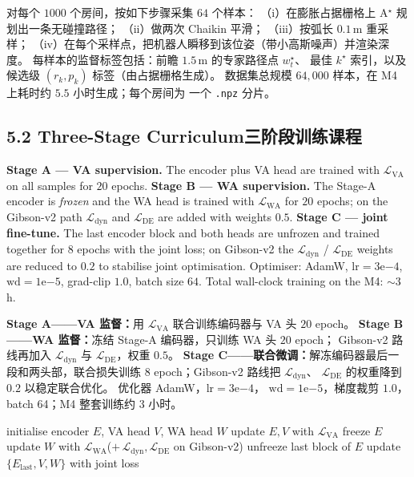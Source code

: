 \documentclass[11pt,a4paper]{article}
\newcommand{\en}[1]{\par\noindent #1\par\vspace{0.15em}}
\newcommand{\zh}[1]{\par\noindent\color{zhcol}\hspace{0.5em}#1\par\color{black}\vspace{0.6em}}
\newcommand{\bisubsec}[2]{\subsection[#1]{#1\quad\normalfont\small\color{zhcol}\textsf{#2}}}
\begin{document}
\zh{\textsf{对每个 $1000$ 个房间，按如下步骤采集 $64$ 个样本：
（i）在膨胀占据栅格上 A$^\star$ 规划出一条无碰撞路径；
（ii）做两次 Chaikin 平滑；
（iii）按弧长 $0.1\,$m 重采样；
（iv）在每个采样点，把机器人瞬移到该位姿（带小高斯噪声）并渲染深度。
每样本的监督标签包括：前瞻 $1.5\,$m 的专家路径点 $w^{\star}_t$、
最佳 $k^{\star}$ 索引，以及候选级 $(r_k, p_k)$ 标签（由占据栅格生成）。
数据集总规模 $64{,}000$ 样本，在 M4 上耗时约 $5.5$ 小时生成；每个房间为
一个 \texttt{.npz} 分片。}}

\bisubsec{5.2 Three-Stage Curriculum}{三阶段训练课程}

\en{\textbf{Stage A — VA supervision.} The encoder plus VA head are
trained with $\mathcal{L}_{\mathrm{VA}}$ on all samples for $20$ epochs.
\textbf{Stage B — WA supervision.} The Stage-A encoder is \emph{frozen}
and the WA head is trained with $\mathcal{L}_{\mathrm{WA}}$ for $20$
epochs; on the Gibson-v2 path $\mathcal{L}_{\mathrm{dyn}}$ and
$\mathcal{L}_{\mathrm{DE}}$ are added with weights $0.5$.
\textbf{Stage C — joint fine-tune.} The last encoder block and both heads
are unfrozen and trained together for $8$ epochs with the joint loss; on
Gibson-v2 the $\mathcal{L}_{\mathrm{dyn}}$ / $\mathcal{L}_{\mathrm{DE}}$
weights are reduced to $0.2$ to stabilise joint optimisation.
Optimiser: AdamW, $\mathrm{lr}=3\mathrm{e}{-4}$,
$\mathrm{wd}=1\mathrm{e}{-5}$, grad-clip $1.0$, batch size $64$.
Total wall-clock training on the M4: $\sim 3\,$h.}

\zh{\textsf{\textbf{Stage A——VA 监督：}用 $\mathcal{L}_{\mathrm{VA}}$
联合训练编码器与 VA 头 $20$ epoch。
\textbf{Stage B——WA 监督：}冻结 Stage-A 编码器，只训练 WA 头 $20$ epoch；
Gibson-v2 路线再加入 $\mathcal{L}_{\mathrm{dyn}}$ 与
$\mathcal{L}_{\mathrm{DE}}$，权重 $0.5$。
\textbf{Stage C——联合微调：}解冻编码器最后一段和两头部，联合损失训练
$8$ epoch；Gibson-v2 路线把 $\mathcal{L}_{\mathrm{dyn}}$、
$\mathcal{L}_{\mathrm{DE}}$ 的权重降到 $0.2$ 以稳定联合优化。
优化器 AdamW，$\mathrm{lr}=3\mathrm{e}{-4}$，
$\mathrm{wd}=1\mathrm{e}{-5}$，梯度裁剪 $1.0$，batch 64；M4 整套训练约
$3$ 小时。}}

\begin{algorithm}[H]
\caption{Three-Stage Training \textsf{\small 三阶段训练}}
\begin{algorithmic}[1]
\State initialise encoder $E$, VA head $V$, WA head $W$
 
  \State update $E, V$ with $\mathcal{L}_{\mathrm{VA}}$
\EndFor
\State freeze $E$
 
  \State update $W$ with $\mathcal{L}_{\mathrm{WA}}$\quad ($+\,\mathcal{L}_{\mathrm{dyn}}, \mathcal{L}_{\mathrm{DE}}$ on Gibson-v2)
\EndFor
\State unfreeze last block of $E$
 
  \State update $\{E_{\text{last}}, V, W\}$ with joint loss
\EndFor
\end{algorithmic}
\end{algorithm}
\end{document}
